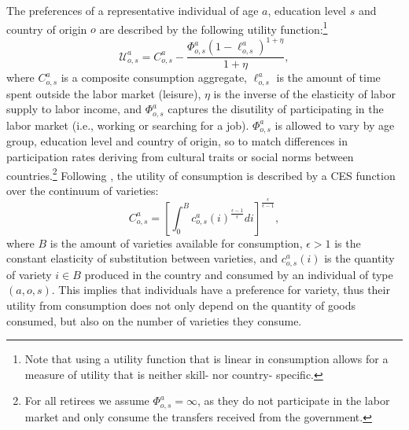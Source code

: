 \documentclass[a4paper,12pt]{article}
\begin{document}
The preferences of a representative individual of age $a$, education level $%
s $ and country of origin $o$ are described by the following utility
function:\footnote{Note that using a utility function that is linear in consumption allows for a measure of utility that is neither skill- nor country- specific.} 
\begin{equation}
\mathcal{U}_{o,s}^{a}=C_{o,s}^{a}-\frac{\Phi _{o,s}^{a}(1-\ell
_{o,s}^{a})^{1+\eta }}{1+\eta },  \label{Eq:Utility}
\end{equation}%
where $C_{o,s}^{a}$ is a composite consumption aggregate, $\ell _{o,s}^{a}$
is the amount of time spent outside the labor market (leisure), $\eta $ is
the inverse of the elasticity of labor supply to labor income, and $\Phi
_{o,s}^{a}$ captures the disutility of participating in the labor market
(i.e., working or searching for a job). $\Phi _{o,s}^{a}$ is allowed to vary
by age group, education level and country of origin, so to match differences
in participation rates deriving from cultural traits or social norms between
countries.\footnote{%
For all retirees we assume $\Phi _{o,s}^{a}=\infty $, as they do not
participate in the labor market and only consume the transfers received from
the government.} Following \citet{Krugman1980}, the utility of consumption is
described by a CES function over the continuum of varieties: 
\begin{equation}
C_{o,s}^{a}=\left[ \int_{0}^{B}c_{o,s}^{a}(i)^{\frac{\epsilon -1}{\epsilon }%
}di\right] ^{\frac{\epsilon }{\epsilon -1}},  \label{Eq:CESGoods}
\end{equation}%
where $B$ is the amount of varieties available for consumption, $\epsilon >1$
is the constant elasticity of substitution between varieties, and $%
c_{o,s}^{a}(i)$ is the quantity of variety $i\in B$ produced in the
country and consumed by an individual of type $(a,o,s)$. This implies that
individuals have a preference for variety, thus their utility from
consumption does not only depend on the quantity of goods consumed, but also
on the number of varieties they consume.
\end{document}
